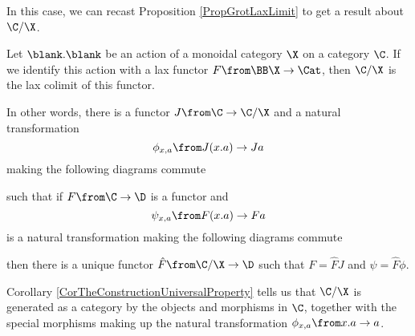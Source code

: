 In this case, we can recast Proposition \ref{PropGrotLaxLimit} to get a result about $\C/\X$.

\begin{corollary}
  Let $\blank.\blank$ be an action of a monoidal category $\X$ on a category $\C$.  
  If we identify this action with a lax functor $F \from \BB \X \to \Cat$, then $\C/\X$ is the lax colimit of this functor.

  In other words, there is a functor $J\from \C \to \C/\X$ and a natural transformation
  \[
    \phi_{x,a}\from J(x.a) \to Ja
    \]
  making the following diagrams commute
  such that if $F\from \C \to \D$ is a functor and
  \[
    \psi_{x,a} \from F(x.a) \to Fa
    \]
   is a natural transformation making the following diagrams commute
  then there is a unique functor $\hat{F}\from \C/\X\to \D$ such that $F=\hat{F}J$ and $\psi=\hat{F}\phi$.
  \label{CorTheConstructionUniversalProperty}
\end{corollary}

Corollary \ref{CorTheConstructionUniversalProperty} tells us that $\C/\X$ is generated as a category by the objects and morphisms in $\C$, together with the special morphisms making up the natural transformation $\phi_{x,a}\from x.a \to a$.  

